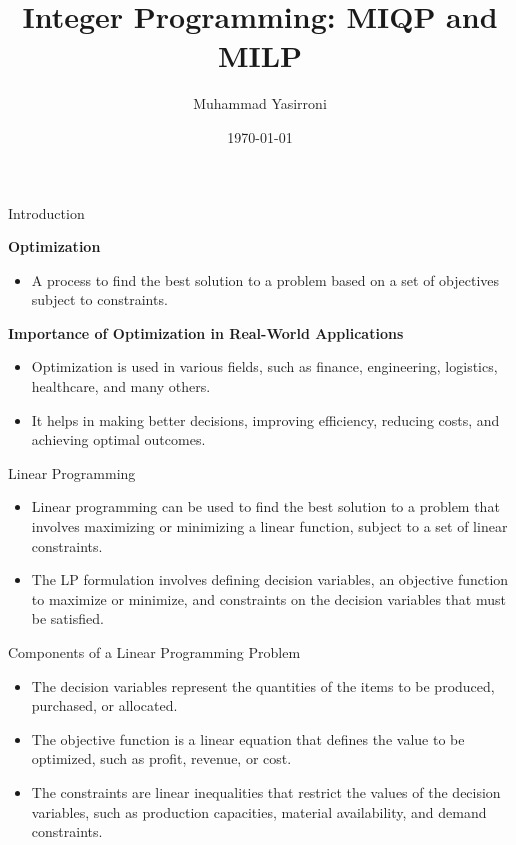 \documentclass{beamer}
\title{Integer Programming: MIQP and MILP}
\author{Muhammad Yasirroni}
\institute{Universitas Gadjah Mada}
\date{\today}
\begin{document}
\frame{\titlepage}

\begin{frame}{Introduction}

    \textbf{Optimization}

    \begin{itemize}
        \item A process to find the best solution to a problem based on a set of objectives subject to constraints.
    \end{itemize}

    \textbf{Importance of Optimization in Real-World Applications}

    \begin{itemize}
        \item Optimization is used in various fields, such as finance, engineering, logistics, healthcare, and many others.
        \item It helps in making better decisions, improving efficiency, reducing costs, and achieving optimal outcomes.
    \end{itemize}

\end{frame}

\begin{frame}{Linear Programming}
    \begin{itemize}
        \item Linear programming can be used to find the best solution to a problem that involves maximizing or minimizing a linear function, subject to a set of linear constraints.
        \item The LP formulation involves defining decision variables, an objective function to maximize or minimize, and constraints on the decision variables that must be satisfied.
    \end{itemize}
\end{frame}

\begin{frame}{Components of a Linear Programming Problem}
    \begin{itemize}
        \item The decision variables represent the quantities of the items to be produced, purchased, or allocated.
        \item The objective function is a linear equation that defines the value to be optimized, such as profit, revenue, or cost.
        \item The constraints are linear inequalities that restrict the values of the decision variables, such as production capacities, material availability, and demand constraints.
    \end{itemize}
\end{frame}
\end{document}

